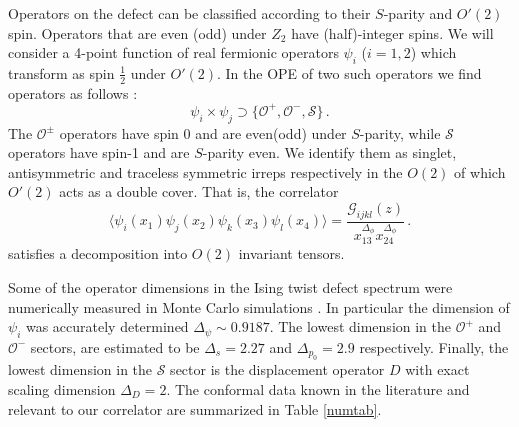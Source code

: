 \documentclass[12pt]{article}
\numberwithin{equation}{section}
\newcommand{\be}{\begin{equation}}
\newcommand{\ee}{\end{equation}}
\def\D{\Delta}
\begin{document}
	Operators on the defect can be classified according to their $S$-parity and $O'(2)$ spin. Operators that are even (odd) under $Z_2$ have (half)-integer spins. We will consider a 4-point function of real fermionic operators $\psi_i$  ($i=1,2$) which transform as spin $\frac 12$ under $O'(2)$. In the OPE of two such operators we find operators as follows \cite{Gaiotto:2013nva}:
	\be
	\psi_i \times \psi_j \supset \{\mathcal{O}^+,\mathcal{O}^-,\mathcal{S}\}\,.
	\ee
	The $\mathcal{O}^{\pm}$ operators have spin 0 and are even(odd) under $S$-parity, while $\mathcal{S}$ operators have spin-1 and are $S$-parity even. We identify them as singlet, antisymmetric and traceless symmetric irreps respectively in the $O(2)$ of which $O'(2)$ acts as a double cover. That is, the correlator
	\be
	\langle\psi_i(x_1)\psi_j(x_2)\psi_k(x_3)\psi_l(x_4)\rangle=\frac{\mathcal{G}_{ijkl}(z)}{x_{13}^{\D_\phi}x_{24}^{\D_\phi}}\,.
	\ee
	satisfies a decomposition into $O(2)$ invariant tensors. 
	
	Some of the operator dimensions in the Ising twist defect spectrum were numerically measured in Monte Carlo simulations \cite{Billo:2013jda}. In particular the dimension of $\psi_i$ was accurately determined $\D_\psi\sim 0.9187$.  The lowest dimension in the $\mathcal{O}^+$ and $\mathcal O^-$ sectors, are estimated to be $\D_s=2.27$ and $\Delta_{p_0}=2.9$ respectively. Finally, the lowest dimension in the $\mathcal S$ sector is the displacement operator $D$ with exact scaling dimension $\D_D=2$. The conformal data known in the literature and relevant to our correlator are summarized in Table \ref{numtab}.
	
\end{document}

